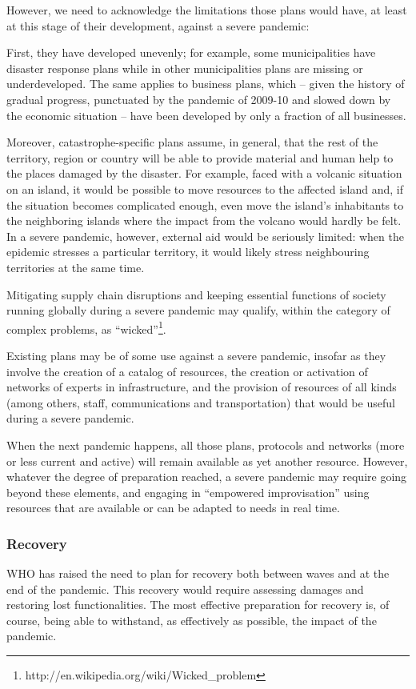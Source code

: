 \documentclass[12pt, a4]{scrartcl}
\begin{document}
However, we need to acknowledge the limitations those plans would have, at least at this stage of their development, against a severe pandemic:

First, they have developed unevenly; for example, some municipalities have disaster response plans while in other municipalities plans are missing or underdeveloped. The same applies to business plans, which – given the history of gradual progress, punctuated by the pandemic of 2009-10 and slowed down by the economic situation – have been developed by only a fraction of all businesses.

Moreover, catastrophe-specific plans assume, in general, that the rest of the territory, region or country will be able to provide material and human help to the places damaged by the disaster. For example, faced with a volcanic situation on an island, it would be possible to move resources to the affected island and, if the situation becomes complicated enough, even move the island's inhabitants to the neighboring islands where the impact from the volcano would hardly be felt. In a severe pandemic, however, external aid would be seriously limited: when the epidemic stresses a particular territory, it would likely stress neighbouring territories at the same time.

Mitigating supply chain disruptions and keeping essential functions of society running globally during a severe pandemic may qualify, within the category of complex problems, as “wicked”\footnote{http://en.wikipedia.org/wiki/Wicked_problem}.

Existing plans may be of some use against a severe pandemic, insofar as they involve the creation of a catalog of resources, the creation or activation of networks of experts in infrastructure, and the provision of resources of all kinds (among others, staff, communications and transportation) that would be useful during a severe pandemic.

When the next pandemic happens, all those plans, protocols and networks (more or less current and active) will remain available as yet another resource. However, whatever the degree of preparation reached, a severe pandemic may require going beyond these elements, and engaging in “empowered improvisation” using resources that are available or can be adapted to needs in real time.

\subsubsection{Recovery}
WHO has raised the need to plan for recovery both between waves and at the end of the pandemic. This recovery would require assessing damages and restoring lost functionalities.
The most effective preparation for recovery is, of course, being able to withstand, as effectively as possible, the impact of the pandemic.
\end{document}
